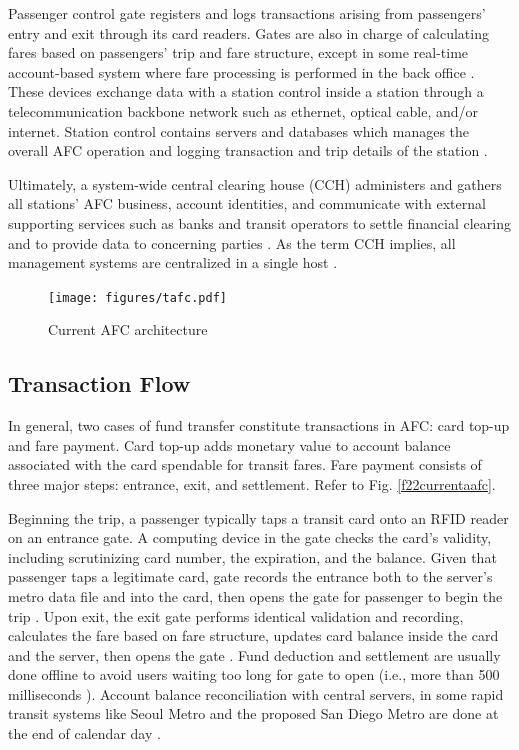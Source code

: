 \documentclass[a4paper,12pt,oneside, utf8x]{report}
\begin{document}
Passenger control gate registers and logs transactions arising from passengers’ entry and exit through its card readers. Gates are also in charge of calculating fares based on passengers’ trip and fare structure, except in some real-time account-based system where fare processing is performed in the back office \cite{p63}. These devices exchange data with a station control inside a station through a telecommunication backbone network such as ethernet, optical cable, and/or internet. Station control contains servers and databases which manages the overall AFC operation and logging transaction and trip details of the station \cite{p4,p16}. 

Ultimately, a system-wide central clearing house (CCH) administers and gathers all stations’ AFC business, account identities, and communicate with external supporting services such as banks and transit operators \cite{p4,p11} to settle financial clearing and to provide data to concerning parties \cite{p13,p63,n18}. As the term CCH implies, all management systems are centralized in a single host \cite{p4,p63}.

    \begin{figure}[H]
        \centering
        \texttt{[image: figures/tafc.pdf]}
        \caption{Current AFC architecture}
        \label{f21currentaafc}
    \end{figure}
    
\subsection{Transaction Flow}
In general, two cases of fund transfer constitute transactions in AFC: card top-up and fare payment. Card top-up adds monetary value to account balance associated with the card spendable for transit fares. Fare payment consists of three major steps: entrance, exit, and settlement. Refer to Fig. \ref{f22currentaafc}. 

Beginning the trip, a passenger typically taps a transit card onto an RFID reader on an entrance gate. A computing device in the gate checks the card’s validity, including scrutinizing card number, the expiration, and the balance. Given that passenger taps a legitimate card, gate records the entrance both to the server’s metro data file and into the card, then opens the gate for passenger to begin the trip \cite{a6}. Upon exit, the exit gate performs identical validation and recording, calculates the fare based on fare structure, updates card balance inside the card and the server, then opens the gate \cite{p13}. Fund deduction and settlement are usually done offline to avoid users waiting too long for gate to open (i.e., more than 500 milliseconds \cite{p14}). Account balance reconciliation with central servers, in some rapid transit systems like Seoul Metro and the proposed San Diego Metro are done at the end of calendar day \cite{p13,p63}.
\end{document}
